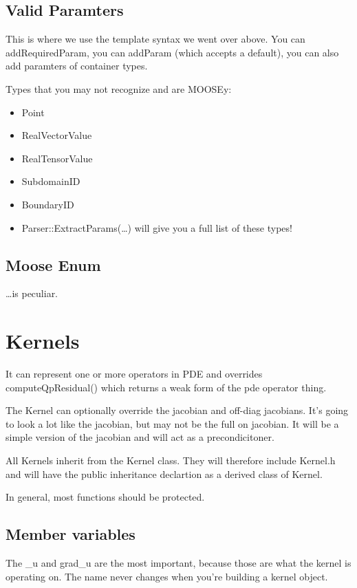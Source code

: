 \subsection{Valid Paramters}

This is where we use the template syntax we went over above. You can 
addRequiredParam, you can addParam (which accepts a default), you can also add 
paramters of container types.

Types that you may not recognize and are MOOSEy: 
\begin{itemize}
  \item Point
  \item RealVectorValue
  \item RealTensorValue
  \item SubdomainID
  \item BoundaryID
  \item Parser::ExtractParams(\ldots) will give you a full list of these types!
\end{itemize}

\subsection{Moose Enum}
\ldots is peculiar.



\section{Kernels}
It can represent one or more operators in PDE and overrides 
computeQpResidual() which returns a weak form of the pde operator thing. 

The Kernel can optionally override the jacobian and off-diag jacobians. It's 
going to look a lot like the jacobian, but may not be the full on jacobian. It 
will be a simple version of the jacobian and will act as a precondicitoner.


All Kernels inherit from the Kernel class. They will therefore include Kernel.h 
and will have the public inheritance declartion as a derived class of Kernel.

In general, most functions should be protected.


\subsection{Member variables}
The \_u and grad\_u are the most important, because those are what the kernel is 
operating on. The name never changes when you're building a kernel object.


